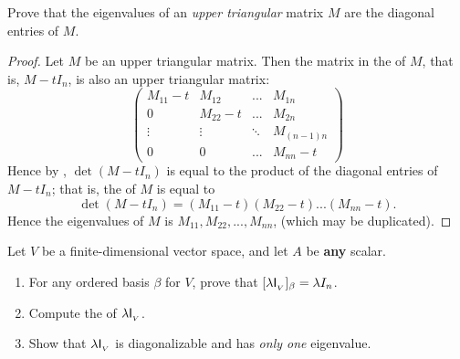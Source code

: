 \begin{exercise} \label{exercise 5.1.10}
Prove that the eigenvalues of an \emph{upper triangular} matrix \(M\) are the diagonal entries of \(M\).
\end{exercise}

\begin{proof}
Let \(M\) be an upper triangular matrix.
Then the matrix in the \CPOLY{} of \(M\), that is, \(M - tI_n\), is also an upper triangular matrix:
\[
    \begin{pmatrix}
        M_{11} - t & M_{12}     & ... & M_{1n} \\
        0          & M_{22} - t & ... & M_{2n} \\
        \vdots     & \vdots     & \ddots & M_{(n-1)n} \\
        0          & 0          & ... & M_{nn} - t
    \end{pmatrix}
\]
Hence by , \(\det(M - tI_n)\) is equal to the product of the diagonal entries of \(M - tI_n\);
that is, the \CPOLY{} of \(M\) is equal to
\[
    \det(M - tI_n) = (M_{11} - t)(M_{22} - t)...(M_{nn} - t).
\]
Hence the eigenvalues of \(M\) is \(M_{11}, M_{22}, ..., M_{nn}\), (which may be duplicated).
\end{proof}

\begin{exercise} \label{exercise 5.1.11}
Let \(V\) be a finite-dimensional vector space, and let \(A\) be \textbf{any} scalar.
\begin{enumerate}
\item For any ordered basis \(\beta\) for \(V\), prove that \([\lambda \textsf{I}_{_V}{}]_{\beta} = \lambda I_n\).
\item Compute the \CPOLY{} of \(\lambda \textsf{I}_{_V}{}\).
\item Show that \(\lambda \textsf{I}_{_V}{}\) is diagonalizable and has \emph{only one} eigenvalue.
\end{enumerate}
\end{exercise}

